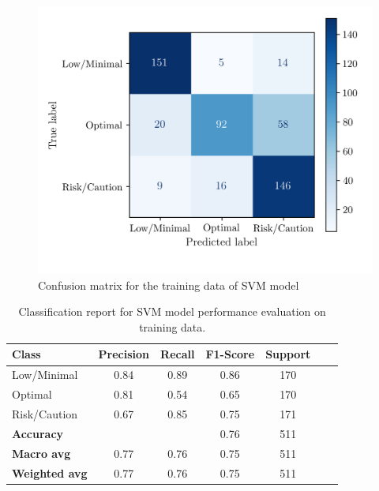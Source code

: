 \documentclass[conference]{IEEEtran}
\begin{document}
\begin{figure}[H]
    \centering
    \includegraphics[width=1\linewidth]{assets/SVM_ConfusionMatrixTrain.png}
    \caption{Confusion matrix for the training data of SVM model}
    \label{svm_cm_train}
\end{figure}

\begin{table}[H]
\centering
\caption{Classification report for SVM model performance evaluation on training data.}
\label{crTrainSVM}
\begin{tabular}{lcccccc}
\toprule
\textbf{Class} & \textbf{Precision} & \textbf{Recall} & \textbf{F1-Score} & \textbf{Support} \\
\midrule
Low/Minimal & 0.84 & 0.89 & 0.86 & 170 \\
Optimal & 0.81 & 0.54 & 0.65 & 170 \\
Risk/Caution & 0.67 & 0.85 & 0.75 & 171 \\
\midrule
\textbf{Accuracy} &  &  & 0.76 & 511 \\
\textbf{Macro avg} & 0.77 & 0.76 & 0.75 & 511 \\
\textbf{Weighted avg} & 0.77 & 0.76 & 0.75 & 511 \\
\bottomrule
\end{tabular}
\end{table}
\end{document}
